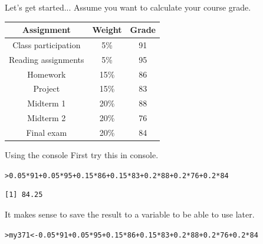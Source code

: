 \documentclass{beamer}\usepackage[]{graphicx}\usepackage[]{color}
\makeatletter
\newcommand{\hlnum}[1]{\textcolor[rgb]{0.824,0.412,0.118}{#1}}%
\newcommand{\hlopt}[1]{\textcolor[rgb]{1,0.894,0.769}{#1}}%
\newcommand{\hlstd}[1]{\textcolor[rgb]{1,0.894,0.769}{#1}}%
\newcommand{\hlkwb}[1]{\textcolor[rgb]{0.804,0.776,0.451}{#1}}%
\newenvironment{kframe}{%
 \def\at@end@of@kframe{}%
 \ifinner\ifhmode%
  \def\at@end@of@kframe{\end{minipage}}%
  \begin{minipage}{\columnwidth}%
 \fi\fi%
 \def\FrameCommand##1{\hskip\@totalleftmargin \hskip-\fboxsep
 \colorbox{shadecolor}{##1}\hskip-\fboxsep
     \hskip-\linewidth \hskip-\@totalleftmargin \hskip\columnwidth}%
 \MakeFramed {\advance\hsize-\width
   \@totalleftmargin\z@ \linewidth\hsize
   \@setminipage}}%
 {\par\unskip\endMakeFramed%
 \at@end@of@kframe}
\newenvironment{knitrout}{}{} %
\makeatother
\begin{document}
\begin{darkframes}
    
    
    
    \begin{frame}{Let's get started...}
    \fontsize{10}{10}\selectfont
    Assume you want to calculate your course grade.
    
      \begin{table}[!b]
        {\carlitoTLF %
        \begin{tabularx}{\textwidth}{ccc}
           
           Assignment & Weight  & Grade \\ 
          \toprule
            Class participation & 5\%	&	91  \\
            Reading assignments & 5\%	&	95  \\
            Homework    & 15\%	&	 86 \\
            Project     & 15\%	&	 83 \\
            Midterm 1   & 20\%	&	 88 \\
            Midterm 2   & 20\%	&	 76 \\
            Final exam  & 20\%	&	 84 \\
        \end{tabularx}}
        
      \end{table} 
    \end{frame}


    \begin{frame}[fragile]{Using the console}
      First try this in console.
\begin{knitrout}
\begin{kframe}
\begin{alltt}
\hlstd{> }  \hlnum{0.05}\hlopt{*}\hlnum{91}\hlopt{+}\hlnum{0.05}\hlopt{*}\hlnum{95}\hlopt{+}\hlnum{0.15}\hlopt{*}\hlnum{86}\hlopt{+}\hlnum{0.15}\hlopt{*}\hlnum{83}\hlopt{+}\hlnum{0.2}\hlopt{*}\hlnum{88}\hlopt{+}\hlnum{0.2}\hlopt{*}\hlnum{76}\hlopt{+}\hlnum{0.2}\hlopt{*}\hlnum{84}
\end{alltt}
\begin{verbatim}
[1] 84.25
\end{verbatim}
\end{kframe}
\end{knitrout}
      \pause
      It makes sense to save the result to a variable to be able to use later.
\begin{knitrout}
\begin{kframe}
\begin{alltt}
\hlstd{> }  \hlstd{my371} \hlkwb{<-} \hlnum{0.05}\hlopt{*}\hlnum{91}\hlopt{+}\hlnum{0.05}\hlopt{*}\hlnum{95}\hlopt{+}\hlnum{0.15}\hlopt{*}\hlnum{86}\hlopt{+}\hlnum{0.15}\hlopt{*}\hlnum{83}\hlopt{+}\hlnum{0.2}\hlopt{*}\hlnum{88}\hlopt{+}\hlnum{0.2}\hlopt{*}\hlnum{76}\hlopt{+}\hlnum{0.2}\hlopt{*}\hlnum{84}
\end{alltt}
\end{kframe}
\end{knitrout}
    \end{frame}




\end{darkframes}
\end{document}
